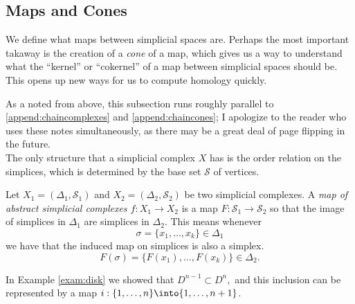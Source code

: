 \subsection{Maps and Cones}
\begin{elevator}
We define what maps between simplicial spaces are. Perhaps the most important takaway is the creation of a \emph{cone} of a map, which gives us a way to understand what the ``kernel'' or ``cokernel'' of a map between simplicial spaces should be. This opens up new ways for us to compute homology quickly. 
\end{elevator}
As a noted from above, this subsection runs roughly parallel to \ref{append:chaincomplexes} and \ref{append:chaincones}; I apologize to the reader who uses these notes simultaneously, as there may be a great deal of page flipping in the future. \\
The only structure that a simplicial complex $X$ has is the order relation on the simplices, which is determined by the base set $\mathcal S$ of vertices. 
\begin{definition}
Let $X_1=(\Delta_1, \mathcal S_1)$ and $X_2=(\Delta_2, \mathcal S_2)$ be two simplicial complexes.  A \emph{map of abstract simplicial complexes $f:X_1\to X_2$ } is a map $F: \mathcal S_1\to \mathcal S_2$ so that the image of simplices in $\Delta_1$ are simplices in $\Delta_2$. This means whenever 
\[\sigma = \{x_1, \ldots, x_k\}\in \Delta_1\]
we have that the induced map on simplices is also a simplex. 
\[F(\sigma)=\{F(x_1), \ldots, F(x_k)\}\in \Delta_2.\]
\end{definition}
\begin{example}
In Example \ref{exam:disk} we showed that $D^{n-1}\subset D^n, $ and this inclusion can be represented by a map $i:\{1, \ldots, n\}\into \{1, \ldots, n+1\}$. 
\end{example}
